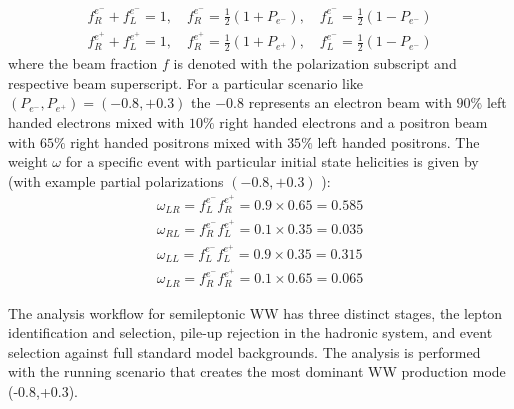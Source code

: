  \begin{equation}
 \begin{split}
f_R^{e^-} + f_L^{e^-} = 1 ,\, \, \, \, \, \, f_R^{e^-} = \frac{1}{2}(1 + P_{e^-}) ,\, \, \, \, \, \, f_L^{e^-}=\frac{1}{2}(1- P_{e^-}) \\
f_R^{e^+} + f_L^{e^+} = 1 ,\, \, \, \, \, \, f_R^{e^+} = \frac{1}{2}(1 + P_{e^+}) , \, \, \, \, \, \, f_L^{e^-}=\frac{1}{2}(1- P_{e^-})
\end{split}
 \end{equation}
where the beam fraction $f$ is denoted with the polarization subscript and respective beam superscript. For a particular scenario like $(P_{e^-}, P_{e^+}) = (-0.8, +0.3)$ the $-0.8$ represents an electron beam with $90\% $ left handed electrons mixed with $10\% $ right handed electrons and a positron beam with $65\%$ right handed positrons mixed with $35\%$ left handed positrons. The weight $\omega$ for a specific event with particular initial state helicities is given by (with example partial polarizations $(-0.8,+0.3)$ ):
 \begin{equation}
 \begin{split} 
 \omega_{LR} = f_L^{e^-}f_R^{e^+} = 0.9 \times 0.65 = 0.585 \\
 \omega_{RL} = f_R^{e^-}f_L^{e^+} = 0.1 \times 0.35 = 0.035 \\
 \omega_{LL} = f_L^{e^-}f_L^{e^+} = 0.9 \times 0.35 = 0.315 \\
 \omega_{LR} = f_R^{e^-}f_R^{e^+} = 0.1 \times 0.65 = 0.065 
 \end{split}
 \end{equation} 

The analysis workflow for semileptonic WW has three distinct stages, the lepton identification and selection, pile-up rejection in the hadronic system, and event selection against full standard model backgrounds. The analysis is performed with the  running scenario that creates the most dominant WW production mode (-0.8,+0.3). 


